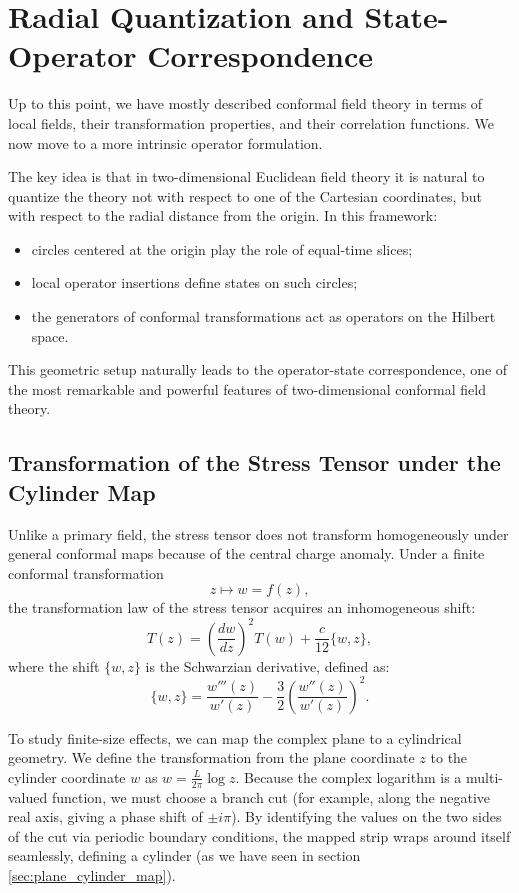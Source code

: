 \section{Radial Quantization and State-Operator Correspondence}
\label{sec:radial_quantization_state_operator}

Up to this point, we have mostly described conformal field theory in terms of local fields, their transformation properties, and their correlation functions. We now move to a more intrinsic operator formulation.

The key idea is that in two-dimensional Euclidean field theory it is natural to quantize the theory not with respect to one of the Cartesian coordinates, but with respect to the radial distance from the origin. In this framework:
\begin{itemize}
    \item circles centered at the origin play the role of equal-time slices;
    \item local operator insertions define states on such circles;
    \item the generators of conformal transformations act as operators on the Hilbert space.
\end{itemize}
This geometric setup naturally leads to the operator-state correspondence, one of the most remarkable and powerful features of two-dimensional conformal field theory.

\subsection{Transformation of the Stress Tensor under the Cylinder Map}

Unlike a primary field, the stress tensor does not transform homogeneously under general conformal maps because of the central charge anomaly. Under a finite conformal transformation
\[
    z \mapsto w = f(z),
\]
the transformation law of the stress tensor acquires an inhomogeneous shift:
\[
    T(z) = \left(\frac{dw}{dz}\right)^2 T(w) + \frac{c}{12}\{w, z\},
\]
where the shift \(\{w, z\}\) is the Schwarzian derivative, defined as:
\[
    \{w, z\} = \frac{w'''(z)}{w'(z)} - \frac{3}{2}\left(\frac{w''(z)}{w'(z)}\right)^2.
\]

To study finite-size effects, we can map the complex plane to a cylindrical geometry. We define the transformation from the plane coordinate \(z\) to the cylinder coordinate \(w\) as \(w = \frac{L}{2\pi} \log z\). Because the complex logarithm is a multi-valued function, we must choose a branch cut (for example, along the negative real axis, giving a phase shift of \(\pm i\pi\)). By identifying the values on the two sides of the cut via periodic boundary conditions, the mapped strip wraps around itself seamlessly, defining a cylinder (as we have seen in section \ref{sec:plane_cylinder_map}).


